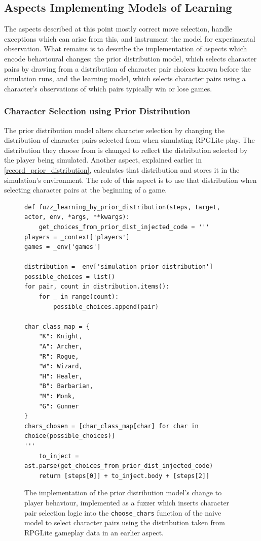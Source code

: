 \subsection{Aspects Implementing Models of Learning}\label{subsec:aspects_modelling_learning}


The aspects described at this point mostly correct move selection, handle
exceptions which can arise from this, and instrument the model for experimental
observation. What remains is to describe the implementation of aspects which
encode behavioural changes: the prior distribution model, which selects
character pairs by drawing from a distribution of character pair choices known
before the simulation runs, and the learning model, which selects character
pairs using a character's observations of which pairs typically win or lose
games. 


\subsubsection{Character Selection using Prior Distribution}
\label{prior_distribution_aspect_description}

The prior distribution model alters character selection by changing the
distribution of character pairs selected from when simulating RPGLite play. The
distribution they choose from is changed to reflect the distribution selected by
the player being simulated. Another aspect, explained earlier in
\cref{record_prior_distribution}, calculates that distribution and stores it in
the simulation's environment. The role of this aspect is to use that
distribution when selecting character pairs at the beginning of a game.

\begin{figure}
  \centering
  \begin{lstlisting}[style=footnotesize_python]
def fuzz_learning_by_prior_distribution(steps, target, actor, env, *args, **kwargs):
    get_choices_from_prior_dist_injected_code = '''
players = _context['players']
games = _env['games']

distribution = _env['simulation prior distribution']
possible_choices = list()
for pair, count in distribution.items():
    for _ in range(count):
        possible_choices.append(pair)

char_class_map = {
    "K": Knight,
    "A": Archer,
    "R": Rogue,
    "W": Wizard,
    "H": Healer,
    "B": Barbarian,
    "M": Monk,
    "G": Gunner
}
chars_chosen = [char_class_map[char] for char in choice(possible_choices)]
'''
    to_inject = ast.parse(get_choices_from_prior_dist_injected_code)
    return [steps[0]] + to_inject.body + [steps[2]]
  \end{lstlisting}
  \caption{The implementation of the prior distribution model's change to player
  behaviour, implemented as a \pdsfthree{} fuzzer which inserts character pair
  selection logic into the \lstinline{choose_chars} function of the naive model
  to select character pairs using the distribution taken from RPGLite gameplay
  data in an earlier aspect.}
  \label{fig:prior_distribution_implementation}
\end{figure}


